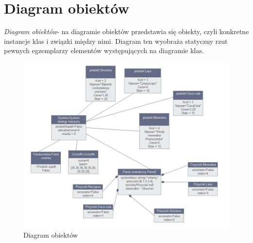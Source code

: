 \documentclass[a4paper, 11pt]{article}
\begin{document}
\section{Diagram obiektów}
\emph{Diagram obiektów}- na diagramie obiektów przedstawia się obiekty, czyli konkretne instancje klas i związki między nimi. Diagram ten wyobraża statyczny rzut pewnych egzemplarzy elementów występujących na diagramie klas.
\begin{figure}[H]
\includegraphics[scale=0.8]{../Diagrams/diagramObiektow2}
\caption{Diagram obiektów}
\end{figure}


%
%
\end{document}
